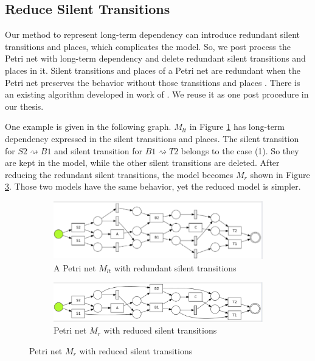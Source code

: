 \subsection{Reduce Silent Transitions}
Our method to represent long-term dependency can introduce redundant silent transitions and places, which complicates the model. So, we post process the Petri net with long-term dependency and delete redundant silent transitions and places in it. 
Silent transitions and places of a Petri net are redundant when the Petri net preserves the behavior without those transitions and places \cite{murata1989petri, verbeek2017decomposed}. There is an existing algorithm developed in work of \cite{verbeek2017decomposed}. We reuse it as one post procedure in our thesis. 

One example is given in the following graph. $M_{lt}$ in Figure \ref{fig:with-lt} has long-term dependency expressed in the silent transitions and places. The silent transition for $S2 \rightsquigarrow B1 $ and silent transition for $B1 \rightsquigarrow T2$ belongs to the case (1). So they are kept in the model, while the other silent transitions are deleted. After reducing the redundant silent transitions, the model becomes $M_r$ shown in Figure \ref{fig:reduced-lt}. Those two models have the same behavior, yet the reduced model is simpler.
\begin{figure}[!h]
	\centering
	\begin{subfigure}[a]{\textwidth}
		\includegraphics[width=\textwidth]{figures/algorithm/dfg-IM-pn-with-lt.png}
		
		\caption{A Petri net $M_{lt}$ with redundant silent transitions}
		\label{fig:with-lt}
	\end{subfigure}
	\hfill
	\begin{subfigure}[b]{\textwidth}
		\centering
		\includegraphics[width=\linewidth]{figures/algorithm/dfg-IM-pn-with-lt-reduced.png}
		
		\caption{Petri net $M_r$ with reduced silent transitions}
		\label{fig:reduced-lt}
	\end{subfigure}
\end{figure}
